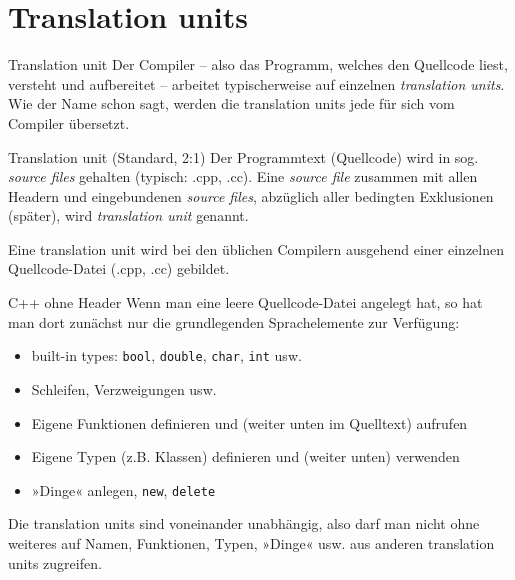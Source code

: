 \section{Translation units}

\begin{frame}{Translation unit}
	Der Compiler -- also das Programm, welches den Quellcode liest, versteht und aufbereitet -- arbeitet typischerweise auf einzelnen \emph{translation units}. Wie der Name schon sagt, werden die translation units jede für sich vom Compiler übersetzt.
	
	\pause
	\vspace{1em}
	
	\begin{block}{Translation unit (Standard, 2:1)}
		Der Programmtext (Quellcode) wird in sog. \emph{source files} gehalten (typisch: .cpp, .cc). Eine \emph{source file} zusammen mit allen Headern und eingebundenen \emph{source files}, abzüglich aller bedingten Exklusionen (später), wird \emph{translation unit} genannt.
	\end{block}
	
	Eine translation unit wird bei den üblichen Compilern ausgehend einer einzelnen Quellcode-Datei (.cpp, .cc) gebildet.
\end{frame}

\begin{frame}[fragile]{C++ ohne Header}
	Wenn man eine leere Quellcode-Datei angelegt hat, so hat man dort zunächst nur die grundlegenden Sprachelemente zur Verfügung:
	
	\begin{itemize}
		\item built-in types: \verb|bool|, \verb|double|, \verb|char|, \verb|int| usw.
		\item Schleifen, Verzweigungen usw.
		\item Eigene Funktionen definieren und (weiter unten im Quelltext) aufrufen
		\item Eigene Typen (z.B. Klassen) definieren und (weiter unten) verwenden
		\item »Dinge« anlegen, \verb|new|, \verb|delete|
	\end{itemize}
	
	\pause
	
	Die translation units sind voneinander unabhängig, also darf man nicht ohne weiteres auf Namen, Funktionen, Typen, »Dinge« usw. aus anderen translation units zugreifen.
\end{frame}

